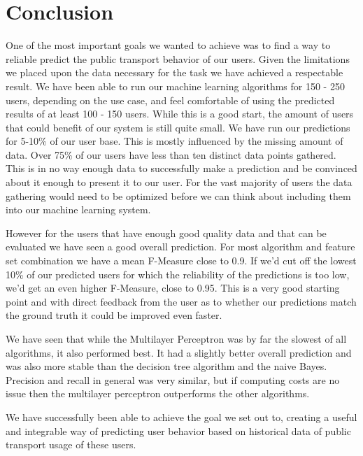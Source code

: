 \newpage
\chapter{Conclusion}

One of the most important goals we wanted to achieve was to find a way to reliable predict the public transport behavior of our users. Given the limitations we placed upon the data necessary for the task we have achieved a respectable result. We have been able to run our machine learning algorithms for 150 - 250 users, depending on the use case, and feel comfortable of using the predicted results of at least 100 - 150 users. While this is a good start, the amount of users that could benefit of our system is still quite small. We have run our predictions for 5-10\% of our user base. This is mostly influenced by the missing amount of data. Over 75\% of our users have less than ten distinct data points gathered. This is in no way enough data to successfully make a prediction and be convinced about it enough to present it to our user. For the vast majority of users the data gathering would need to be optimized before we can think about including them into our machine learning system.

However for the users that have enough good quality data and that can be evaluated we have seen a good overall prediction. For most algorithm and feature set combination we have a mean F-Measure close to 0.9. If we'd cut off the lowest 10\% of our predicted users for which the reliability of the predictions is too low, we'd get an even higher F-Measure, close to 0.95. This is a very good starting point and with direct feedback from the user as to whether our predictions match the ground truth it could be improved even faster.

We have seen that while the Multilayer Perceptron was by far the slowest of all algorithms, it also performed best. It had a slightly better overall prediction and was also more stable than the decision tree algorithm and the naive Bayes. Precision and recall in general was very similar, but if computing costs are no issue then the multilayer perceptron outperforms the other algorithms.

We have successfully been able to achieve the goal we set out to, creating a useful and integrable way of predicting user behavior based on historical data of public transport usage of these users.